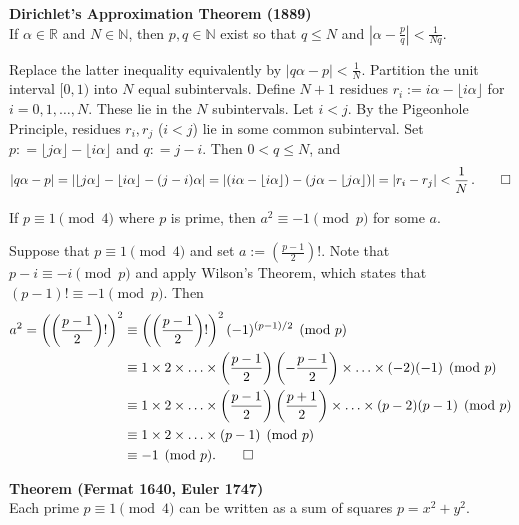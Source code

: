\documentclass[a4paper]{article}
\let\oldendproof\endproof
\renewenvironment{proof}[1][\proofname]{%
  \oldproof[\scshape \noindent {\bfseries \text{Proof}}]%
}{\oldendproof}
\newcommand{\lemma}{\bigskip\noindent{\bf Lemma.}\;\;}
\newenvironment{thm}[1]{
	\begin{framed}
	\noindent
	{\bfseries #1}\\}{
	\end{framed}
}
\begin{document}
\begin{thm}{Dirichlet's Approximation Theorem (1889)}
If $\alpha \in \mathbb{R}$ and $N \in \mathbb{N}$,
then $p,q \in \mathbb{N}$ exist so that $q \leq N$ and $|\alpha - \frac{p}{q}| < \frac{1}{Nq}$.
\end{thm}

\begin{proof}
Replace the latter inequality equivalently by $| q\alpha - p| < \frac{1}{N}$.
Partition the unit interval $[0,1)$ into $N$ equal subintervals.
Define $N+1$ residues $r_i := i \alpha - \lfloor i\alpha \rfloor$ for $i = 0,1,\ldots, N$.
These lie in the $N$ subintervals.
Let $i<j$.
By the Pigeonhole Principle, residues $r_i, r_j$ ($i<j$) lie in some common subinterval.
Set $p: = \lfloor j\alpha \rfloor - \lfloor i \alpha \rfloor$ and $q: = j-i$.
Then $0 < q \leq N$, and
\[
  |q\alpha - p|
    = |\lfloor j\alpha \rfloor - \lfloor i\alpha \rfloor - (j-i)\alpha|
	= |(i\alpha - \lfloor i \alpha \rfloor) - (j\alpha - \lfloor j \alpha \rfloor)|
	= | r_i - r_j|
	< \frac{1}{N}\,.\qedhere
\]
\end{proof}

\lemma
If $p \equiv 1 \pmod 4$ where $p$ is prime, then $a^2 \equiv -1\pmod p$ for some $a$.

\begin{proof}
Suppose that $p \equiv 1 \pmod 4$ and set $a := \left(\frac{p-1}{2}\right)!$. Note that $p-i \equiv -i \pmod p$ and apply Wilson's Theorem, which states that $(p-1)! \equiv -1 \pmod p$. Then
\begin{align*}
	a^2 = \left(\left(\frac{p-1}{2}\right)!\right)^2
	& \equiv \left(\left(\frac{p-1}{2}\right)!\right)^2 (-1)^{(p-1)/2} \pmod p\\
	& \equiv 1 \times 2 \times \ldots \times \left(\frac{p-1}{2}\right)\left(-\frac{p-1}{2}\right) \times \ldots \times (-2)(-1) \pmod p\\
	& \equiv 1 \times 2 \times \ldots \times \left(\frac{p-1}{2}\right)\left(\frac{p+1}{2}\right) \times \ldots \times (p-2)(p-1) \pmod p\\
	& \equiv 1 \times 2 \times \ldots \times (p-1) \pmod p\\
	& \equiv -1 \pmod p. \qedhere
\end{align*}
\end{proof}

\begin{thm}{Theorem (Fermat 1640, Euler 1747)}
Each prime $p \equiv 1 \pmod 4$ can be written as a sum of squares $p = x^2 + y^2$.
\end{thm}
\end{document}
